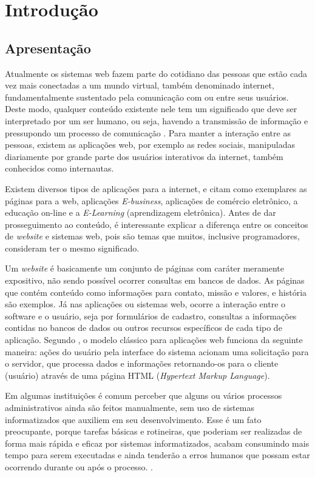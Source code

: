 \newpage
\chapter{Introdução}
\hspace{2.5cm}

\section{Apresentação}
Atualmente os sistemas web fazem parte do cotidiano das pessoas que estão cada vez mais conectadas a um mundo virtual, também denominado internet, fundamentalmente sustentado pela comunicação com ou entre seus usuários.
Deste modo, qualquer conteúdo existente nele tem um significado que deve ser interpretado por um ser humano, ou seja, havendo a transmissão de informação e pressupondo um processo de comunicação . Para manter a interação entre as pessoas, existem as aplicações web, por exemplo as redes sociais, manipuladas diariamente por grande parte dos usuários interativos da internet, também conhecidos como internautas. 

Existem diversos tipos de aplicações para a internet,  e  citam como exemplares as páginas para a web, aplicações \textit{E-business}, aplicações de comércio eletrônico, a educação on-line e a \textit{E-Learning} (aprendizagem eletrônica). Antes de dar prosseguimento ao conteúdo, é interessante explicar a diferença entre os conceitos de \textit{website} e sistemas web, pois são temas que muitos, inclusive programadores, consideram ter o mesmo significado. 

Um \textit{website} é basicamente um conjunto de páginas com caráter meramente expositivo, não sendo possível ocorrer consultas em bancos de dados. As páginas que contém conteúdo como informações para contato, missão e valores, e história são exemplos. Já nas aplicações ou sistemas web, ocorre a interação entre o software e o usuário, seja por formulários de cadastro, consultas a informações contidas no bancos de dados ou outros recursos específicos de cada tipo de aplicação. Segundo , o modelo clássico para aplicações web funciona da seguinte maneira: ações do usuário pela interface do sistema acionam uma solicitação para o servidor, que processa dados e informações retornando-os para o cliente (usuário) através de uma página HTML
(\textit{Hypertext Markup Language}).

Em algumas instituições é comum perceber que alguns ou vários processos administrativos ainda são feitos manualmente, sem uso de sistemas informatizados que auxiliem em seu desenvolvimento. Esse é um fato preocupante, porque tarefas básicas e rotineiras, que poderiam ser realizadas de forma mais rápida e eficaz por sistemas informatizados, acabam consumindo mais tempo para serem executadas e ainda tenderão a erros humanos que possam estar ocorrendo durante ou após o processo. \cite{othman2009development}. 

